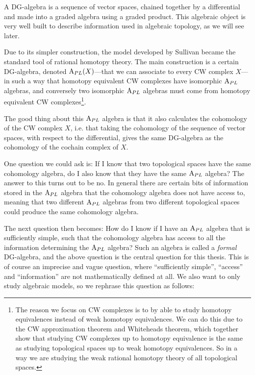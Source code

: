 A DG-algebra is a sequence of vector spaces, chained together by a differential and made into a graded algebra using a graded product. This algebraic object is very well built to describe information used in algebraic topology, as we will see later. 

Due to its simpler construction, the model developed by Sullivan became the standard tool of rational homotopy theory. The main construction is a certain DG-algebra, denoted $\text{A}_{PL}(X)$---that we can associate to every CW complex $X$---in such a way that homotopy equivalent CW complexes have isomorphic $\text{A}_{PL}$ algebras, and conversely two isomorphic $\text{A}_{PL}$ algebras must come from homotopy equivalent CW complexes\footnote{The reason we focus on CW complexes is to by able to study homotopy equivalences instead of weak homotopy equivalences. We can do this due to the CW approximation theorem and Whiteheads theorem, which together show that studying CW complexes up to homotopy equivalence is the same as studying topological spaces up to weak homotopy equivalences. So in a way we are studying the weak rational homotopy theory of all topological spaces.}.


The good thing about this $\text{A}_{PL}$ algebra is that it also calculates the cohomology of the CW complex $X$, i.e. that taking the cohomology of the sequence of vector spaces, with respect to the differential, gives the same DG-algebra as the cohomology of the cochain complex of $X$. 

One question we could ask is: If I know that two topological spaces have the same cohomology algebra, do I also know that they have the same $\text{A}_{PL}$ algebra? The answer to this turns out to be no. In general there are certain bits of information stored in the $\text{A}_{PL}$ algebra that the cohomology algebra does not have access to, meaning that two different $\text{A}_{PL}$ algebras from two different topological spaces could produce the same cohomology algebra.

The next question then becomes: How do I know if I have an $\text{A}_{PL}$ algebra that is sufficiently simple, such that the cohomology algebra has access to all the information determining the $\text{A}_{PL}$ algebra? Such an algebra is called a \emph{formal} DG-algebra, and the above question is the central question for this thesis. This is of course an imprecise and vague question, where ``sufficiently simple'', ``access'' and ``information'' are not mathematically defined at all. We also want to only study algebraic models, so we rephrase this question as follows: 

